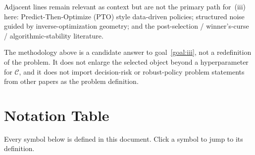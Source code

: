 \documentclass[12pt]{article}
\theoremstyle{plain}
\begin{document}
Adjacent lines remain relevant as context but are not the primary path for~(iii) here: Predict-Then-Optimize (PTO) style data-driven policies; structured noise guided by inverse-optimization geometry; and the post-selection / winner's-curse / algorithmic-stability literature.

\label{rem:methods-not-problem}
The methodology above is a candidate answer to goal~\ref{goal:iii}, not a redefinition of the problem.
It does not enlarge the selected object beyond a hyperparameter for $\mathcal{C}$, and it does not import decision-risk or robust-policy problem statements from other papers as the problem definition.

\section{Notation Table}
\label{sec:symbol-table}

Every symbol below is defined in this document.
Click a symbol to jump to its definition.
\end{document}
